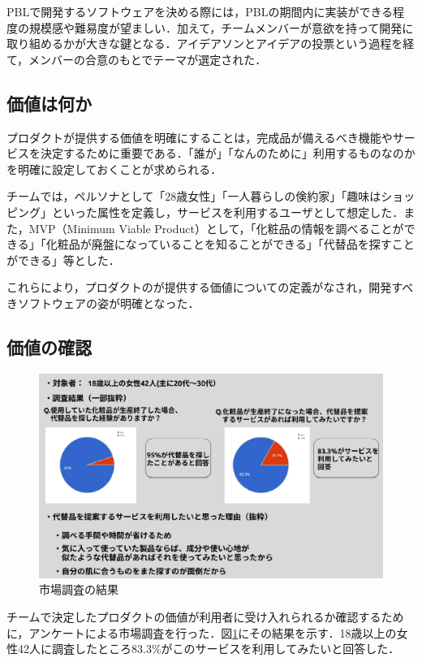 \documentclass[fontsize=9pt, jafontscale=.95, twocolumn, a4paper]{jlreq}
\begin{document}
PBLで開発するソフトウェアを決める際には，PBLの期間内に実装ができる程度の規模感や難易度が望ましい．加えて，チームメンバーが意欲を持って開発に取り組めるかが大きな鍵となる．アイデアソンとアイデアの投票という過程を経て，メンバーの合意のもとでテーマが選定された．

\subsection{価値は何か}
\label{sec:orgb96f597}
プロダクトが提供する価値を明確にすることは，完成品が備えるべき機能やサービスを決定するために重要である．「誰が」「なんのために」利用するものなのかを明確に設定しておくことが求められる．

チームでは，ペルソナとして「28歳女性」「一人暮らしの倹約家」「趣味はショッピング」といった属性を定義し，サービスを利用するユーザとして想定した．また，MVP（Minimum Viable Product）として，「化粧品の情報を調べることができる」「化粧品が廃盤になっていることを知ることができる」「代替品を探すことができる」等とした．

これらにより，プロダクトのが提供する価値についての定義がなされ，開発すべきソフトウェアの姿が明確となった．

\subsection{価値の確認}
\label{sec:orgfc0adef}

\begin{figure}[tb]
\centering
\includegraphics[width=.9\linewidth]{./images/marketing.png}
\caption{\label{fig:orgad24bd8}市場調査の結果}
\end{figure}

チームで決定したプロダクトの価値が利用者に受け入れられるか確認するために，アンケートによる市場調査を行った．図\ref{fig:orgad24bd8}にその結果を示す．18歳以上の女性42人に調査したところ83.3\%がこのサービスを利用してみたいと回答した．
\end{document}

